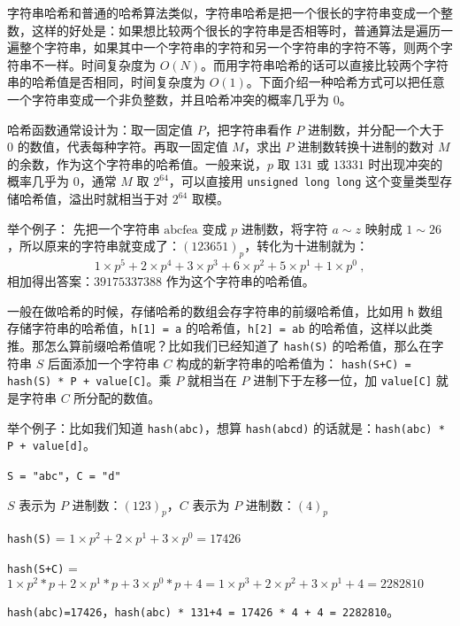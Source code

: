 
字符串哈希和普通的哈希算法类似，字符串哈希是把一个很长的字符串变成一个整数，这样的好处是：如果想比较两个很长的字符串是否相等时，普通算法是遍历一遍整个字符串，如果其中一个字符串的字符和另一个字符串的字符不等，则两个字符串不一样。时间复杂度为 $O(N)$。而用字符串哈希的话可以直接比较两个字符串的哈希值是否相同，时间复杂度为 $O(1)$。下面介绍一种哈希方式可以把任意一个字符串变成一个非负整数，并且哈希冲突的概率几乎为 $0$。

哈希函数通常设计为：取一固定值 $P$，把字符串看作 $P$ 进制数，并分配一个大于 $0$ 的数值，代表每种字符。再取一固定值 $M$，求出 $P$ 进制数转换十进制的数对 $M$ 的余数，作为这个字符串的哈希值。一般来说，$p$ 取 $131$ 或 $13331$ 时出现冲突的概率几乎为 $0$，通常 $M$ 取 $2^{64}$，可以直接用 \verb`unsigned long long` 这个变量类型存储哈希值，溢出时就相当于对 $2^{64}$ 取模。

举个例子：
先把一个字符串 $\text{abcfea}$ 变成 $p$ 进制数，将字符 $a \sim z$ 映射成 $1 \sim 26$，所以原来的字符串就变成了：$(123651)_p$，转化为十进制就为：\begin{equation}
1 \times p^5 + 2 \times p^4 + 3 \times p^3 + 6 \times p^2 + 5 \times p^1 + 1 \times p^0~,
\end{equation}
相加得出答案：$39175337388$ 作为这个字符串的哈希值。

一般在做哈希的时候，存储哈希的数组会存字符串的前缀哈希值，比如用 \verb`h` 数组存储字符串的哈希值，\verb`h[1] = a` 的哈希值，\verb`h[2] = ab` 的哈希值，这样以此类推。那怎么算前缀哈希值呢？比如我们已经知道了 \verb`hash(S)` 的哈希值，那么在字符串 $S$ 后面添加一个字符串 $C$ 构成的新字符串的哈希值为： \verb`hash(S+C) = hash(S) * P + value[C]`。乘 $P$ 就相当在 $P$ 进制下于左移一位，加 \verb`value[C]` 就是字符串 $C$ 所分配的数值。

举个例子：比如我们知道 \verb`hash(abc)`，想算 \verb`hash(abcd)` 的话就是：\verb`hash(abc) * P + value[d]`。

\verb`S = "abc"`，\verb`C = "d"`

$S$ 表示为 $P$ 进制数：$(123)_p$，$C$ 表示为 $P$ 进制数：$(4)_p$

\verb`hash(S)` = $1 \times p^2 + 2 \times p^1 + 3 \times p^0=17426 $

\verb`hash(S+C)` = $1 \times p^2 *p + 2 \times p^1*p + 3 \times p^0*p + 4 = 1 \times p^3 + 2 \times p ^ 2 + 3 \times p^1 + 4=2282810 $

\verb`hash(abc)=17426`，\verb`hash(abc) * 131+4 = 17426 * 4 + 4 = 2282810`。


